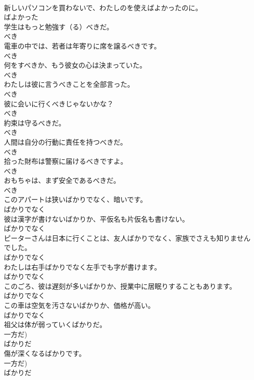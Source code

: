 \documentclass[8pt]{extreport}
\begin{document}
\begin{CJK}{UTF8}{min}
\\	新しいパソコンを買わないで、わたしのを使えばよかったのに。	
\\	ばよかった
\\	学生はもっと勉強す（る）べきだ。	
\\	べき
\\	電車の中では、若者は年寄りに席を譲るべきです。	
\\	べき
\\	何をすべきか、もう彼女の心は決まっていた。	
\\	べき
\\	わたしは彼に言うべきことを全部言った。	
\\	べき
\\	彼に会いに行くべきじゃないかな？	
\\	べき
\\	約束は守るべきだ。	
\\	べき
\\	人間は自分の行動に責任を持つべきだ。	
\\	べき
\\	拾った財布は警察に届けるべきですよ。	
\\	べき
\\	おもちゃは、まず安全であるべきだ。	
\\	べき
\\	このアパートは狭いばかりでなく、暗いです。	
\\	ばかりでなく
\\	彼は漢字が書けないばかりか、平仮名も片仮名も書けない。	
\\	ばかりでなく
\\	ピーターさんは日本に行くことは、友人ばかりでなく、家族でさえも知りませんでした。	
\\	ばかりでなく
\\	わたしは右手ばかりでなく左手でも字が書けます。	
\\	ばかりでなく
\\	このごろ、彼は遅刻が多いばかりか、授業中に居眠りすることもあります。	
\\	ばかりでなく
\\	この車は空気を汚さないばかりか、価格が高い。	
\\	ばかりでなく
\\	祖父は体が弱っていくばかりだ。	
\\	一方だ)	
\\	ばかりだ
\\	傷が深くなるばかりです。	
\\	一方だ)	
\\	ばかりだ

\end{CJK}
\end{document}

